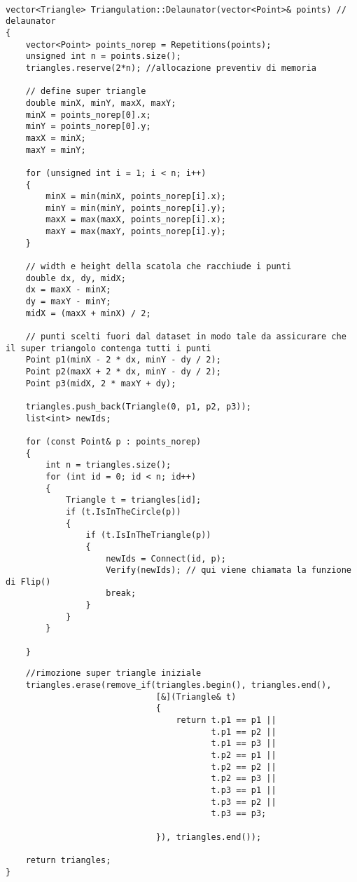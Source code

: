 \documentclass{article}
\begin{document}
\begin{lstlisting}

vector<Triangle> Triangulation::Delaunator(vector<Point>& points) // delaunator
{
    vector<Point> points_norep = Repetitions(points);
    unsigned int n = points.size();
    triangles.reserve(2*n); //allocazione preventiv di memoria

    // define super triangle
    double minX, minY, maxX, maxY;
    minX = points_norep[0].x;
    minY = points_norep[0].y;
    maxX = minX;
    maxY = minY;

    for (unsigned int i = 1; i < n; i++)
    {
        minX = min(minX, points_norep[i].x);
        minY = min(minY, points_norep[i].y);
        maxX = max(maxX, points_norep[i].x);
        maxY = max(maxY, points_norep[i].y);
    }

    // width e height della scatola che racchiude i punti
    double dx, dy, midX;
    dx = maxX - minX;
    dy = maxY - minY;
    midX = (maxX + minX) / 2;

    // punti scelti fuori dal dataset in modo tale da assicurare che il super triangolo contenga tutti i punti
    Point p1(minX - 2 * dx, minY - dy / 2);
    Point p2(maxX + 2 * dx, minY - dy / 2);
    Point p3(midX, 2 * maxY + dy);
   
    triangles.push_back(Triangle(0, p1, p2, p3));
    list<int> newIds;

    for (const Point& p : points_norep)
    {
        int n = triangles.size();
        for (int id = 0; id < n; id++)
        {
            Triangle t = triangles[id];
            if (t.IsInTheCircle(p))
            {
                if (t.IsInTheTriangle(p))
                {
                    newIds = Connect(id, p);
                    Verify(newIds); // qui viene chiamata la funzione di Flip()
                    break;
                }
            }
        }

    }
\end{lstlisting}
\newpage
\begin{lstlisting}
    //rimozione super triangle iniziale
    triangles.erase(remove_if(triangles.begin(), triangles.end(),
                              [&](Triangle& t)
                              {
                                  return t.p1 == p1 ||
                                         t.p1 == p2 ||
                                         t.p1 == p3 ||
                                         t.p2 == p1 ||
                                         t.p2 == p2 ||
                                         t.p2 == p3 ||
                                         t.p3 == p1 ||
                                         t.p3 == p2 ||
                                         t.p3 == p3;

                              }), triangles.end());

    return triangles;
}
\end{lstlisting}
\end{document}
